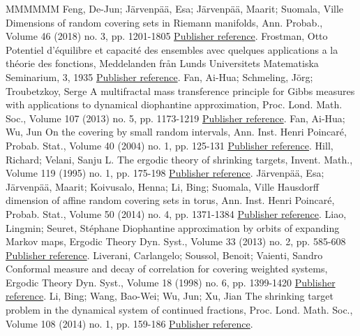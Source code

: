 \begin{thebibliography}{MMMMMM}
 Feng, De-Jun; Järvenpää, Esa; Järvenpää, Maarit; Suomala, Ville Dimensions of random covering sets in Riemann manifolds, Ann. Probab., Volume 46 (2018) no. 3, pp. 1201-1805 \href{https://ahl.centre-mersenne.org/item/AHL_2019__2__1_0/#fengetal}{Publisher reference}.
 Frostman, Otto Potentiel d’équilibre et capacité des ensembles avec quelques applications a la théorie des fonctions, Meddelanden från Lunds Universitets Matematiska Seminarium, 3, 1935 \href{https://ahl.centre-mersenne.org/item/AHL_2019__2__1_0/#frostman}{Publisher reference}.
 Fan, Ai-Hua; Schmeling, Jörg; Troubetzkoy, Serge A multifractal mass transference principle for Gibbs measures with applications to dynamical diophantine approximation, Proc. Lond. Math. Soc., Volume 107 (2013) no. 5, pp. 1173-1219 \href{https://ahl.centre-mersenne.org/item/AHL_2019__2__1_0/#fanschmelingtroubetzkoy}{Publisher reference}.
 Fan, Ai-Hua; Wu, Jun On the covering by small random intervals, Ann. Inst. Henri Poincaré, Probab. Stat., Volume 40 (2004) no. 1, pp. 125-131 \href{https://ahl.centre-mersenne.org/item/AHL_2019__2__1_0/#fanwu}{Publisher reference}.
 Hill, Richard; Velani, Sanju L. The ergodic theory of shrinking targets, Invent. Math., Volume 119 (1995) no. 1, pp. 175-198 \href{https://ahl.centre-mersenne.org/item/AHL_2019__2__1_0/#hillvelani}{Publisher reference}.
 Järvenpää, Esa; Järvenpää, Maarit; Koivusalo, Henna; Li, Bing; Suomala, Ville Hausdorff dimension of affine random covering sets in torus, Ann. Inst. Henri Poincaré, Probab. Stat., Volume 50 (2014) no. 4, pp. 1371-1384 \href{https://ahl.centre-mersenne.org/item/AHL_2019__2__1_0/#jarvenpaaetal}{Publisher reference}.
 Liao, Lingmin; Seuret, Stéphane Diophantine approximation by orbits of expanding Markov maps, Ergodic Theory Dyn. Syst., Volume 33 (2013) no. 2, pp. 585-608 \href{https://ahl.centre-mersenne.org/item/AHL_2019__2__1_0/#liaoseuret}{Publisher reference}.
 Liverani, Carlangelo; Soussol, Benoit; Vaienti, Sandro Conformal measure and decay of correlation for covering weighted systems, Ergodic Theory Dyn. Syst., Volume 18 (1998) no. 6, pp. 1399-1420 \href{https://ahl.centre-mersenne.org/item/AHL_2019__2__1_0/#liveranietal}{Publisher reference}.
 Li, Bing; Wang, Bao-Wei; Wu, Jun; Xu, Jian The shrinking target problem in the dynamical system of continued fractions, Proc. Lond. Math. Soc., Volume 108 (2014) no. 1, pp. 159-186 \href{https://ahl.centre-mersenne.org/item/AHL_2019__2__1_0/#liwangwuxu}{Publisher reference}.

\end{thebibliography}

